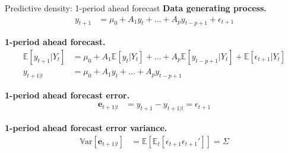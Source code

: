 \documentclass[notes,blackandwhite,mathsans,usenames,dvipsnames]{beamer}
\begin{document}
\begin{frame}{Predictive density: 1-period ahead forecast}
\small
\textbf{Data generating process.}
\begin{align*}
y_{t+1} &= \mu_0 + A_1 y_{t} + \dots + A_p y_{t-p+1} + \epsilon_{t+1}
\end{align*} 

\smallskip\textbf{1-period ahead forecast.}
\begin{align*}
\mathbb{E}[y_{t+1}|Y_t] &= \mu_0 + A_1 \mathbb{E}[y_{t}|Y_t] + \dots + A_p \mathbb{E}[y_{t-p+1}|Y_t] + \mathbb{E}[\epsilon_{t+1}|Y_t]\\
y_{t+1|t} &= \mu_0 + A_1 y_{t} + \dots + A_p y_{t-p+1}
\end{align*} 

\smallskip\textbf{1-period ahead forecast error.}
\begin{align*}
\mathbf{e}_{t+1|t} &= y_{t+1} - y_{t+1|t} = \epsilon_{t+1}
\end{align*} 

\smallskip\textbf{1-period ahead forecast error variance.}
\begin{align*}
\mathbb{V}\text{ar}[\mathbf{e}_{t+1|t}] &= \mathbb{E}\left[\mathbb{E}_t[\epsilon_{t+1}\epsilon_{t+1}']\right] = \Sigma 
\end{align*} 

\end{frame}
\end{document}
